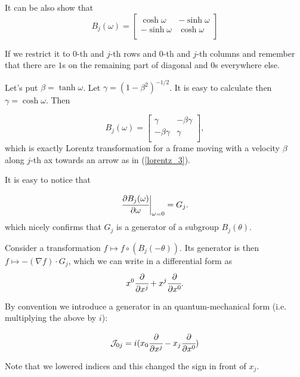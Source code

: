 \documentclass[main.tex]{subfiles}
\begin{document}
It can be also show that
\begin{equation}
B_{j}(\omega) =
\begin{bmatrix}
\cosh\omega & -\sinh\omega \\
-\sinh\omega & \cosh\omega \\
\end{bmatrix} 
\end{equation}

If we restrict it to $0$-th and $j$-th rows and $0$-th and $j$-th columns and remember that there are $1$s on the remaining part of diagonal and $0$s everywhere else.

Let's put $\beta = \tanh\omega$. Let $\gamma = (1 - \beta^2)^{-1/2}$. It is easy to calculate then $\gamma = \cosh\omega$. Then 

\begin{equation}
B_{j}(\omega) =
\begin{bmatrix}
\gamma & -\beta\gamma \\
-\beta\gamma & \gamma \\
\end{bmatrix}, 
\end{equation}
 which is exactly Lorentz transformation for a frame moving with a velocity $\beta$ along $j$-th ax towards an arrow as in (\ref{lorentz_3}).


It is easy to notice that

\begin{equation}
\cfrac{\partial B_{j}(\omega)}{\partial \omega}\bigg|_{\omega=0} = G_{j}.
\end{equation}
which nicely confirms that $G_{j}$ is a generator of a subgroup $B_{j}(\theta)$.

Consider a transformation $f \mapsto f\circ (B_{j}(-\theta))$. 
Its generator is then $f \mapsto -(\nabla f) \cdot G_{j}$, which we can write in a differential form as
\begin{equation}
x^0\cfrac{\partial }{\partial x^j} + x^j\cfrac{\partial }{\partial x^0}. 
\end{equation}

By convention we introduce a generator in an quantum-mechanical form (i.e. multiplying the above by $i$):

\begin{equation}
\mathcal{J}_{0j} = i(x_0\cfrac{\partial }{\partial x^j} - x_j\cfrac{\partial }{\partial x^0})
\end{equation}  

Note that we lowered indices and this changed the sign in front of $x_j$.
\end{document}
